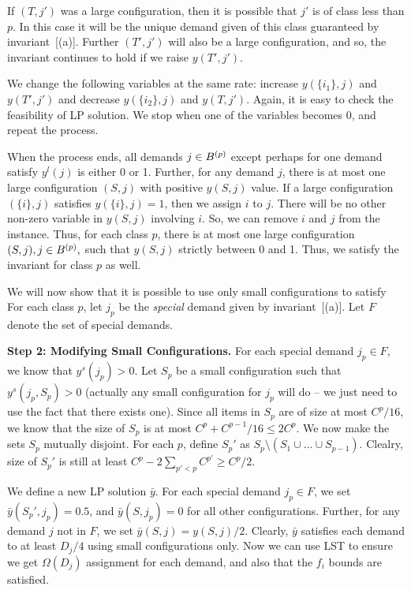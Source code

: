 If $(T,j')$ was a large configuration, then it is possible that $j'$ is of class less than $p$. In this case it will be the unique demand given of this class guaranteed by invariant~[(a)]. Further $(T',j')$ will also be a large configuration, and so, the invariant continues to hold if we raise $y(T',j')$.

We change the following variables at the same rate: increase $y(\{i_1\},j)$ and $y(T',j')$ and decrease $y(\{i_2\},j)$ and $y(T,j')$. Again, it is easy to check the feasibility of LP solution. We stop when one of the variables becomes 0, and repeat the process.

When the process ends, all demands $j \in B^{(p)}$  except perhaps for one demand satisfy $y^l(j)$ is either 0 or 1. Further, for any demand $j$, there is at most one large configuration $(S,j)$ with positive $y(S,j)$ value. If a large configuration $(\{i\},j)$ satisfies $y(\{i\},j)=1$, then we assign $i$ to $j$. There will be no other non-zero variable in $y(S,j)$ involving $i$. So, we can remove $i$ and $j$ from the instance. Thus, for each class $p$, there is at most one large configuration $(S,j), j \in B^{(p)},$  such that $y(S,j)$ strictly between 0 and 1.  Thus, we  satisfy the invariant for class $p$ as well.

We will now show that it is possible to use only small configurations to satisfy
For each class $p$, let $j_p$ be the {\em special} demand given by invariant~[(a)]. Let $F$ denote the set of special demands.

\medskip \noindent
{\bf Step 2: Modifying Small Configurations.} For each special demand $j_p \in F$, we know that $y^s(j_p) > 0$. Let $S_p$ be a small configuration such that $y^s(j_p, S_p) > 0$ (actually any small configuration for $j_p$ will do -- we just need to use the fact that there exists one). Since all items in $S_p$ are of size at most $C^p/16$, we know that the size of $S_p$ is at most $C^p + C^{p-1}/16 \leq 2C^p$. We now make the sets $S_p$ mutually disjoint. For each $p$, define $S_p'$ as $S_p \setminus (S_1 \cup \ldots \cup S_{p-1})$. Clealry, size of $S_p'$ is still at least $C^p - 2\sum_{p' < p} C^{p'} \geq C^p/2. $

We define a new LP solution ${\bar y}$.
For each special demand $j_p \in F$,
we set ${\bar y}(S_p',j_p) = 0.5$, and ${\bar y}(S,j_p) = 0$ for all other configurations. Further, for any demand $j$ not in $F$, we set ${\bar y}(S,j) =  y(S,j)/2$. Clearly, ${\bar y}$ satisfies each demand to at least $D_j/4$ using small configurations only. Now we can use LST to ensure we get $\Omega(D_j)$ assignment for each demand, and also that the $f_i$ bounds are satisfied.


